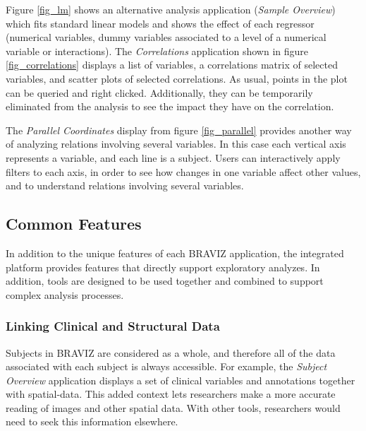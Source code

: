 \documentclass{frontiersHLTH}
\begin{document}
Figure \ref{fig_lm} shows an alternative analysis application (\emph{Sample Overview}) which fits standard linear models and shows the effect of each regressor (numerical variables, dummy variables associated to a level of a numerical variable or interactions). The \emph{Correlations} application shown in figure \ref{fig_correlations} displays a list of variables, a correlations matrix of selected variables, and scatter plots of selected correlations. As usual, points in the plot can be queried and right clicked. Additionally, they can be temporarily eliminated from the analysis to see the impact they have on the correlation. 

The \emph{Parallel Coordinates} display from figure \ref{fig_parallel} provides another way of analyzing relations involving several variables. In this case each vertical axis represents a variable, and each line is a subject. Users can interactively apply filters to each axis, in order to see how changes in one variable affect other values, and to understand relations involving several variables.

\subsection{Common Features}

In addition to the unique features of each BRAVIZ application, the integrated platform provides features that directly support exploratory analyzes. In addition, tools are designed to be used together and combined to support complex analysis processes.

\subsubsection{Linking Clinical and Structural Data}

Subjects in BRAVIZ are  considered as a whole, and therefore all of the data associated with each subject is always accessible. For example, the \emph{Subject Overview} application displays a set of clinical variables and annotations together with spatial-data. This added context lets researchers make a more accurate reading of images and other spatial data. With other tools, researchers would need to seek this information elsewhere. 
\end{document}
